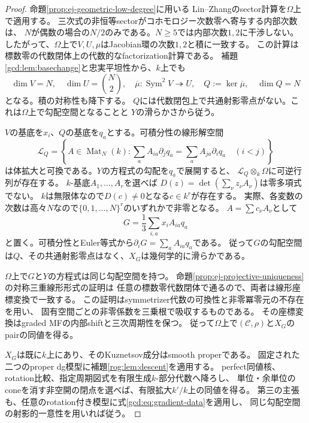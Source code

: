 \begin{proof}
命題\ref{prop:ej-geometric-low-degree}に用いる
Lin--Zhangのsector計算\cite[Theorem~3.5, Remark~3.6]{LZ}を$\Omega$上で適用する。
三次式の非恒等sectorがコホモロジー次数零へ寄与する内部次数は、
$N$が偶数の場合の$N/2$のみである。$N\ge5$では内部次数$1,2$に干渉しない。
したがって、$\Omega$上で$V,U,\mu$はJacobian環の次数$1,2$と積に一致する。
この計算は標数零の代数閉体上の代数的なfactorization計算である。
補題\ref{gcd:lem:basechange}と忠実平坦性から、$k$上でも
\begin{equation}\label{gcd:eq:gradient-data}
 \dim V=N,\quad \dim U=\binom N2,\quad
 \overline\mu:\operatorname{Sym}^2V\twoheadrightarrow U,\quad
 Q:=\ker\overline\mu,\quad\dim Q=N
\end{equation}
となる。積の対称性も降下する。
$Q$には代数閉包上で共通射影零点がない。これは$\Omega$上で勾配空間となることと
$Y$の滑らかさから従う。

$V$の基底を$x_i$、$Q$の基底を$q_a$とする。可積分性の線形解空間
\begin{equation}\label{gcd:eq:integrability}
 \mathcal L_Q=\left\{A\in\operatorname{Mat}_N(k):
 \sum_a A_{ia}\partial_jq_a=\sum_a A_{ja}\partial_iq_a\quad(i<j)\right\}
\end{equation}
は体拡大と可換である。$Y$の方程式の勾配を$q_a$で展開すると、
$\mathcal L_Q\otimes_k\Omega$に可逆行列が存在する。
$k$-基底$A_1,\ldots,A_r$を選べば
$D(z)=\det(\sum_\nu z_\nu A_\nu)$は零多項式でない。
$k$は無限体なので$D(c)\ne0$となる$c\in k^r$が存在する。
実際、各変数の次数は高々$N$なので$\{0,1,\ldots,N\}^r$のいずれかで非零となる。
$A=\sum c_\nu A_\nu$として
\begin{equation}\label{gcd:eq:model}
 G=\frac13\sum_{i,a}x_iA_{ia}q_a
\end{equation}
と置く。可積分性とEuler等式から$\partial_iG=\sum_aA_{ia}q_a$である。
従って$G$の勾配空間は$Q$、その共通射影零点はなく、$X_G$は幾何学的に滑らかである。

$\Omega$上で$G$と$Y$の方程式は同じ勾配空間を持つ。
命題\ref{prop:ej-projective-uniqueness}の対称三重線形形式の証明は
任意の標数零代数閉体で通るので、両者は線形座標変換で一致する。
この証明はsymmetrizer代数の可換性と非零冪零元の不存在を用い、
固有空間ごとの非零係数を三乗根で吸収するものである。
その座標変換はgraded MFの内部shiftと三次周期性を保つ。
従って$\Omega$上で$(\mathcal C,\rho)$と$X_G$のpairの同値を得る。

$X_G$は既に$k$上にあり、そのKuznetsov成分はsmooth properである。
固定された二つのproper dg模型に補題\ref{rog:lem:descent}を適用する。
perfect同値核、rotation比較、指定周期図式を有限生成$k$-部分代数へ降ろし、
単位・余単位のconeを消す非空開の閉点を選べば、有限拡大$k'/k$上の同値を得る。
第三の主張も、任意のrotation付き模型に式\eqref{gcd:eq:gradient-data}を適用し、
同じ勾配空間の射影的一意性を用いれば従う。
\end{proof}

